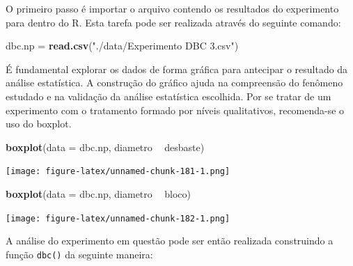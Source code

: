 \documentclass[
]{article}
\newenvironment{Shaded}{\begin{snugshade}}{\end{snugshade}}
\newcommand{\DataTypeTok}[1]{\textcolor[rgb]{0.13,0.29,0.53}{#1}}
\newcommand{\KeywordTok}[1]{\textcolor[rgb]{0.13,0.29,0.53}{\textbf{#1}}}
\newcommand{\NormalTok}[1]{#1}
\newcommand{\OperatorTok}[1]{\textcolor[rgb]{0.81,0.36,0.00}{\textbf{#1}}}
\newcommand{\StringTok}[1]{\textcolor[rgb]{0.31,0.60,0.02}{#1}}
\begin{document}
O primeiro passo é importar o arquivo contendo os resultados do experimento para dentro do R. Esta tarefa pode ser realizada através do seguinte comando:

\begin{Shaded}
\begin{Highlighting}[]
\NormalTok{dbc.np =}\StringTok{ }\KeywordTok{read.csv}\NormalTok{(}\StringTok{"./data/Experimento DBC 3.csv"}\NormalTok{)}
\end{Highlighting}
\end{Shaded}

É fundamental explorar os dados de forma gráfica para antecipar o resultado da análise estatística. A construção do gráfico ajuda na compreensão do fenômeno estudado e na validação da análise estatística escolhida. Por se tratar de um experimento com o tratamento formado por níveis qualitativos, recomenda-se o uso do boxplot.

\begin{Shaded}
\begin{Highlighting}[]
\KeywordTok{boxplot}\NormalTok{(}\DataTypeTok{data =}\NormalTok{ dbc.np, diametro }\OperatorTok{~}\StringTok{ }\NormalTok{desbaste)}
\end{Highlighting}
\end{Shaded}

\texttt{[image: figure-latex/unnamed-chunk-181-1.png]}

\begin{Shaded}
\begin{Highlighting}[]
\KeywordTok{boxplot}\NormalTok{(}\DataTypeTok{data =}\NormalTok{ dbc.np, diametro }\OperatorTok{~}\StringTok{ }\NormalTok{bloco)}
\end{Highlighting}
\end{Shaded}

\texttt{[image: figure-latex/unnamed-chunk-182-1.png]}

A análise do experimento em questão pode ser então realizada construindo a função \texttt{dbc()} da seguinte maneira:

\begin{Shaded}
\end{Shaded}
\end{document}
